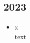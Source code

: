 \subsection{2023}
\begin{history}


    \begin{itemize}

        \item x\\
              text

    \end{itemize}

\end{history}
